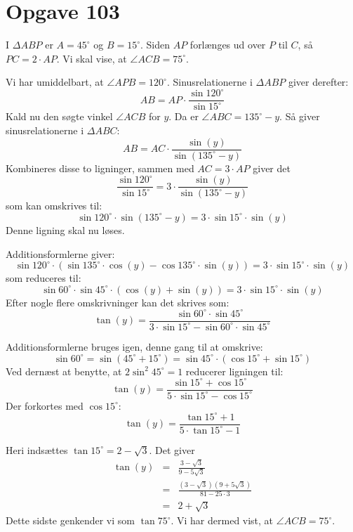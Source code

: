 \documentclass[12pt,oneside,a4paper]{article}
\newcommand{\bas}{\begin{eqnarray*}}
\newcommand{\eas}{\end{eqnarray*}}
\begin{document}
\section*{Opgave 103}

I $\Delta ABP$ er $A=45^\circ$ og $B=15^\circ$. Siden $AP$ forlænges ud over
$P$ til $C$, så $PC = 2\cdot AP$. Vi skal vise, at $\angle ACB = 75^\circ$.

Vi har umiddelbart, at $\angle APB = 120^\circ$.  Sinusrelationerne i $\Delta
ABP$ giver derefter:
$$
AB = AP \cdot \frac{\sin 120^\circ}{\sin 15^\circ}
$$
Kald nu den søgte vinkel $\angle ACB$ for $y$.  Da er $\angle ABC = 135^\circ -
y$.  Så giver sinusrelationerne i
$\Delta ABC$:
$$
AB = AC \cdot \frac{\sin (y)}{\sin(135^\circ-y)}
$$
Kombineres disse to ligninger, sammen med $AC = 3 \cdot AP$ giver det
$$
\frac{\sin 120^\circ}{\sin 15^\circ} = 3 \cdot \frac{\sin (y)}{\sin(135^\circ-y)}
$$
som kan omskrives til:
$$
\sin 120^\circ \cdot \sin(135^\circ - y) = 3 \cdot \sin 15^\circ \cdot \sin(y)
$$
Denne ligning skal nu løses.

Additionsformlerne giver:
$$
\sin 120^\circ \cdot \left(\sin 135^\circ \cdot \cos (y) - \cos 135^\circ \cdot \sin
(y)\right) = 3 \cdot \sin 15^\circ \cdot \sin(y)
$$
som reduceres til:
$$
\sin 60^\circ \cdot \sin 45^\circ \cdot (\cos(y) + \sin(y)) = 3 \cdot \sin 15^\circ \cdot \sin(y)
$$
Efter nogle flere omskrivninger kan det skrives som:
$$
\tan(y) = \frac{\sin 60^\circ \cdot \sin 45^\circ}{3\cdot\sin15^\circ -
\sin 60^\circ \cdot \sin 45^\circ}
$$

Additionsformlerne bruges igen, denne gang til at omskrive:
$$
\sin 60^\circ = \sin(45^\circ + 15^\circ) = \sin 45^\circ \cdot (
\cos 15^\circ + \sin 15^\circ)
$$
Ved dernæst at benytte, at $2\sin^2 45^\circ = 1$ reducerer ligningen til:
$$
\tan(y) = \frac{\sin 15^\circ + \cos 15^\circ}{5\cdot\sin 15^\circ - \cos
15^\circ}
$$
Der forkortes med $\cos 15^\circ$:
$$
\tan(y) = \frac{\tan 15^\circ + 1}{5 \cdot \tan 15^\circ - 1}
$$

Heri indsættes $\tan 15^\circ = 2 - \sqrt{3}$. Det giver
\bas
\tan(y) &=& \frac{3-\sqrt{3}}{9-5\sqrt{3}} \\
        &=& \frac{(3-\sqrt{3})(9+5\sqrt{3})}{81-25\cdot 3} \\
        &=& 2 + \sqrt{3}
\eas
Dette sidste genkender vi som $\tan 75^\circ$. Vi har dermed vist, at
$\angle ACB = 75^\circ$.
\end{document}
